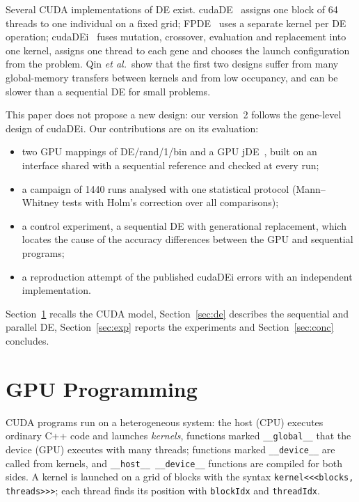 \documentclass[conference]{IEEEtran}
\begin{document}
Several CUDA implementations of DE exist. cudaDE~\cite{veronese2010} assigns one block of
64 threads to one individual on a fixed grid; FPDE~\cite{dominguez2011} uses a separate kernel
per DE operation; cudaDEi~\cite{qin2012} fuses mutation, crossover, evaluation and replacement
into one kernel, assigns one thread to each gene and chooses the launch configuration from
the problem. Qin \emph{et al.}\ show that the first two designs suffer from many
global-memory transfers between kernels and from low occupancy, and can be slower than a
sequential DE for small problems.

This paper does not propose a new design: our version~2 follows the gene-level design of
cudaDEi. Our contributions are on its evaluation:
\begin{itemize}
  \item two GPU mappings of DE/rand/1/bin and a GPU jDE~\cite{brest2006}, built on an
        interface shared with a sequential reference and checked at every run;
  \item a campaign of 1440 runs analysed with one statistical protocol (Mann--Whitney
        tests with Holm's correction over all comparisons);
  \item a control experiment, a sequential DE with generational replacement, which locates
        the cause of the accuracy differences between the GPU and sequential programs;
  \item a reproduction attempt of the published cudaDEi errors with an independent
        implementation.
\end{itemize}
Section~\ref{sec:gpu} recalls the CUDA model, Section~\ref{sec:de} describes the sequential
and parallel DE, Section~\ref{sec:exp} reports the experiments and Section~\ref{sec:conc}
concludes.

\section{GPU Programming}\label{sec:gpu}
CUDA programs run on a heterogeneous system: the host (CPU) executes ordinary C++ code and
launches \emph{kernels}, functions marked \texttt{\_\_global\_\_} that the device (GPU)
executes with many threads; functions marked \texttt{\_\_device\_\_} are called from
kernels, and \texttt{\_\_host\_\_ \_\_device\_\_} functions are compiled for both sides.
A kernel is launched on a grid of blocks with the syntax
\texttt{kernel<<<blocks, threads>>>}; each thread finds its position with
\texttt{blockIdx} and \texttt{threadIdx}.
\end{document}
